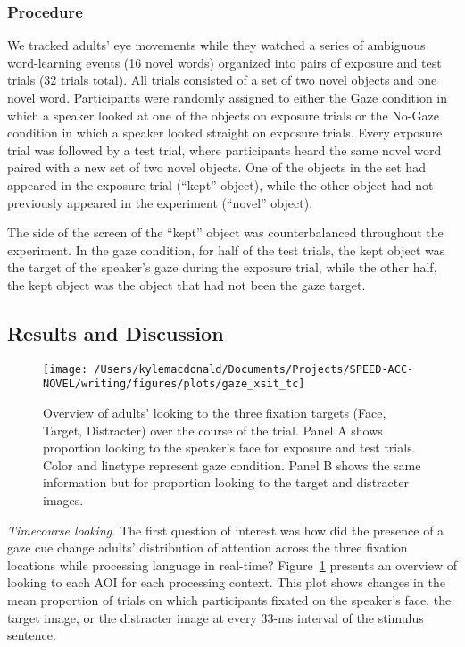 \documentclass[man,floatsintext]{apa6}
\begin{document}
\subsubsection{Procedure}\label{procedure-1}

We tracked adults' eye movements while they watched a series of
ambiguous word-learning events (16 novel words) organized into pairs of
exposure and test trials (32 trials total). All trials consisted of a
set of two novel objects and one novel word. Participants were randomly
assigned to either the Gaze condition in which a speaker looked at one
of the objects on exposure trials or the No-Gaze condition in which a
speaker looked straight on exposure trials. Every exposure trial was
followed by a test trial, where participants heard the same novel word
paired with a new set of two novel objects. One of the objects in the
set had appeared in the exposure trial (\enquote{kept} object), while
the other object had not previously appeared in the experiment
(\enquote{novel} object).

The side of the screen of the \enquote{kept} object was counterbalanced
throughout the experiment. In the gaze condition, for half of the test
trials, the kept object was the target of the speaker's gaze during the
exposure trial, while the other half, the kept object was the object
that had not been the gaze target.

\subsection{Results and Discussion}\label{results-and-discussion-1}

\begin{figure}[!t]

{\centering \texttt{[image: /Users/kylemacdonald/Documents/Projects/SPEED-ACC-NOVEL/writing/figures/plots/gaze\_xsit\_tc]} 

}

\caption{Overview of adults' looking to the three fixation targets (Face, Target, Distracter) over the course of the trial. Panel A shows proportion looking to the speaker's face for exposure and test trials. Color and linetype represent gaze condition. Panel B shows the same information but for proportion looking to the target and distracter images.}\label{fig:gaze-xsit-tc-plot}
\end{figure}

\emph{Timecourse looking.} The first question of interest was how did
the presence of a gaze cue change adults' distribution of attention
across the three fixation locations while processing language in
real-time? Figure~\ref{fig:gaze-xsit-tc-plot} presents an overview of
looking to each AOI for each processing context. This plot shows changes
in the mean proportion of trials on which participants fixated on the
speaker's face, the target image, or the distracter image at every 33-ms
interval of the stimulus sentence.
\end{document}
